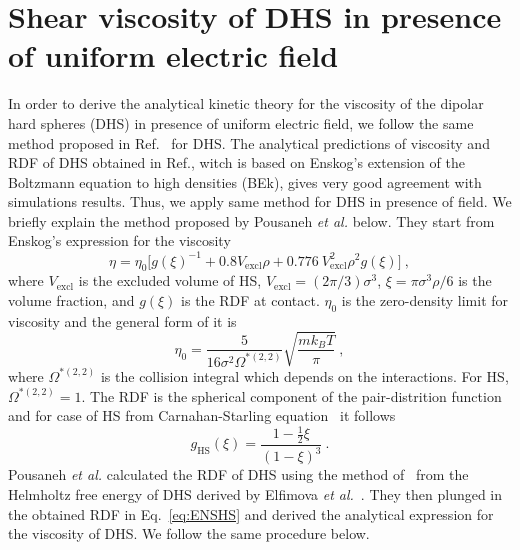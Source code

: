 \documentclass[preprint,pre,aps,superscriptaddress,a4paper]{revtex4}
\begin{document}
\section{Shear viscosity of DHS in presence of uniform electric field}
In order to derive the analytical kinetic theory for the viscosity of the dipolar hard spheres (DHS) in presence of uniform electric field, we follow the same method proposed in Ref.~\cite{faezehastrid} for DHS.  The analytical predictions of viscosity and RDF of DHS obtained in Ref.\cite{faezehastrid}, witch is based on Enskog's extension of the Boltzmann equation to high densities (BEk), gives very good agreement with simulations results. Thus, we apply same method for DHS in presence of field. 
We briefly explain the method proposed by Pousaneh {\it {et al.}} below. 
They start from Enskog's expression for the viscosity ~\cite{Chapman:52:0,Santos:16:0,Viswanath:07:0,Sengers:00:0,Lucas:79:0}
\begin{equation}
\eta= \eta_0 \bigg [ g(\xi)^{-1}+0.8 V_\mathrm{excl} \rho + 0.776~ V^2_\mathrm{excl} \rho^2 g(\xi) \bigg]~,
\label{eq:ENSHS}
\end{equation} 
where $V_\mathrm{excl} $ is the excluded volume of HS,  $V_\mathrm{excl}=(2\pi/3) \sigma^3 $, $\xi= \pi \sigma^3 \rho/6$ is the volume fraction,  and $g(\xi)$ is the RDF at contact. $\eta_0$ is the zero-density limit for viscosity and the general form of  it is
\begin{equation}
\eta_0=\frac{5}{16\sigma^2 \Omega^{*(2,2)}}\sqrt{\frac{mk_B T}{\pi}}~,
\label{eq:eta0}
\end{equation} 
where ${\Omega^{*(2,2)}}$  is the collision integral  which  depends on the interactions.
For HS, ${\Omega^{*(2,2)}}=1$.
The RDF  is the spherical component of the pair-distrition function and for  case of HS from   Carnahan-Starling equation~\cite{Carnahan:69:00} it follows
\begin{equation}
g_\mathrm{HS}(\xi) = \frac{ 1 - \frac12 \xi}{(1-\xi)^3}~.\label{eq:CSRDF}
\end{equation}
Pousaneh {\it {et al.}} calculated the RDF of DHS using the method  of~\cite{Madden:78:00,Lee:89:0,Kusalik:88:0,patey:85:00}
from the Helmholtz free energy of DHS derived by Elfimova {\it {et al.}}~\cite{Elfimova:16:00}. They then plunged in the obtained RDF in Eq.~\ref{eq:ENSHS} and derived the analytical expression for the viscosity of DHS. We follow the same procedure below.
\end{document}
